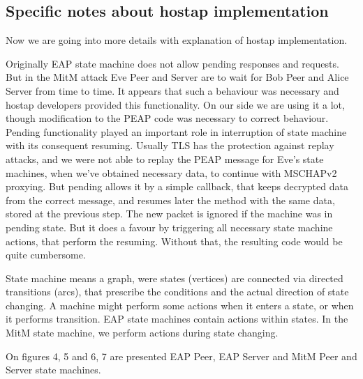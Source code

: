 \documentclass{extarticle}
\begin{document}
\subsection{Specific notes about hostap implementation}

Now we are going into more details with explanation of hostap implementation.

Originally EAP state machine does not allow pending responses
and requests. But in the MitM attack
Eve Peer and Server are to wait for Bob Peer and Alice Server from time to time.
It appears that such a behaviour was necessary and hostap developers provided
this functionality.
On our side we are using it a lot,
though modification to the PEAP
code was necessary to correct behaviour.
Pending functionality played an important role in interruption of state machine
with its consequent resuming.
Usually TLS has the protection against replay attacks,
and we were not able to replay the PEAP message for Eve's state machines,
when we've obtained necessary data,
to continue with MSCHAPv2 proxying.
But pending allows it by a simple callback,
that keeps decrypted data from the correct message,
and resumes later the method with the same data,
stored at the previous step.
The new packet is ignored if the machine was in pending state.
But it does a favour by triggering all necessary state machine
actions, that perform the resuming. Without that,
the resulting code would be quite cumbersome.

State machine means a graph, were states (vertices) are connected
via directed transitions (arcs), that prescribe the conditions
and the actual direction of state changing.
A machine might perform some actions when it enters a state,
or when it performs transition.
EAP state machines contain actions within states.
In the MitM state machine, we perform actions during state changing.

On figures 4, 5 and 6, 7 are presented EAP Peer, EAP Server and MitM Peer
and Server state machines.
\end{document}
